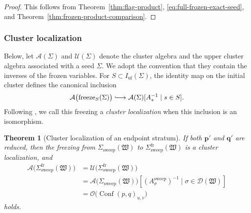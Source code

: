 \documentclass[10pt,a4paper]{article}
\newtheorem{theorem}{Theorem}[section]
\theoremstyle{definition}
\theoremstyle{remark}
\newcommand{\Conf}{\operatorname{Conf}}
\newcommand{\Dcal}{\mathcal D}
\newcommand{\fW}{\mathfrak W}
\begin{document}
\begin{proof}
This follows from Theorem~\ref{thm:flag-product},
\eqref{eq:full-frozen-exact-seed}, and
Theorem~\ref{thm:frozen-product-comparison}.
\end{proof}

\subsubsection{Cluster localization}

Below, let \(\mathcal A(\Sigma)\) and \(\mathcal U(\Sigma)\) denote the cluster
algebra and the upper cluster algebra associated with a seed \(\Sigma\).  We adopt
the convention that they contain the inverses of the frozen variables.  For
\(S\subset I_{\mathrm{uf}}(\Sigma)\), the identity map on the initial cluster
defines the canonical inclusion
\[
 \mathcal A\bigl(\operatorname{freeze}_S(\Sigma)\bigr)
 \lhook\joinrel\longrightarrow
 \mathcal A(\Sigma)[A_s^{-1}\mid s\in S].
\]
Following \cite[Definition~3.3]{Muller2013}, we call this freezing a
\emph{cluster localization} when this inclusion is an isomorphism.

\begin{theorem}[Cluster localization of an endpoint stratum]
\label{thm:endpoint-cluster-localization}
If both \(\mathbf p'\) and \(\mathbf q'\) are reduced, then the freezing from
\(\Sigma_{\mathrm{sweep}}(\fW)\) to
\(\Sigma_{\mathrm{sweep}}^{\mathrm{fr}}(\fW)\) is a cluster localization,
and
\begin{equation}
 \begin{aligned}
 \mathcal A\bigl(\Sigma_{\mathrm{sweep}}^{\mathrm{fr}}(\fW)\bigr)
 &=\mathcal U\bigl(\Sigma_{\mathrm{sweep}}^{\mathrm{fr}}(\fW)\bigr)\\
 &=\mathcal A\bigl(\Sigma_{\mathrm{sweep}}(\fW)\bigr)
   \left[(A_\sigma^{\mathrm{sweep}})^{-1}
         \mid\sigma\in\Dcal(\fW)\right]\\
 &=\mathcal O\bigl(\Conf(p,q)_{u,v}\bigr)
 \end{aligned}
 \label{eq:endpoint-cluster-localization}
\end{equation}
holds.
\end{theorem}
\end{document}
